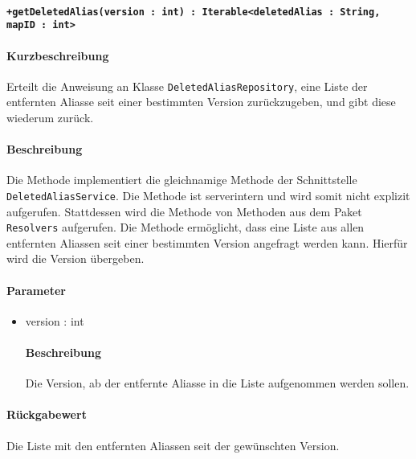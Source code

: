 \paragraph*{\texttt{+getDeletedAlias(version : int) : Iterable<deletedAlias : String, mapID : int>}}%
\paragraph*{Kurzbeschreibung}
Erteilt die Anweisung an Klasse \texttt{DeletedAliasRepository}, eine Liste der entfernten Aliasse seit einer bestimmten Version zurückzugeben, und gibt diese wiederum zurück.
\paragraph*{Beschreibung}
Die Methode implementiert die gleichnamige Methode der Schnittstelle \texttt{DeletedAliasService}.
Die Methode ist serverintern und wird somit nicht explizit aufgerufen.
Stattdessen wird die Methode von Methoden aus dem Paket \texttt{Resolvers} aufgerufen.
Die Methode ermöglicht, dass eine Liste aus allen entfernten Aliassen seit einer bestimmten Version angefragt werden kann.
Hierfür wird die Version übergeben.
\paragraph*{Parameter}
\begin{itemize}
    \item version : int
    		\paragraph*{Beschreibung}
    		Die Version, ab der entfernte Aliasse in die Liste aufgenommen werden sollen.
\end{itemize}
\paragraph*{Rückgabewert}
Die Liste mit den entfernten Aliassen seit der gewünschten Version.
